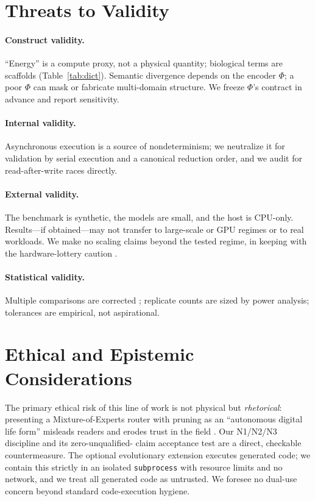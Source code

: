 \documentclass[11pt]{article}
\begin{document}
\section{Threats to Validity}
\paragraph{Construct validity.}
``Energy'' is a compute proxy, not a physical quantity; biological terms are
scaffolds (Table~\ref{tab:dict}). Semantic divergence depends on the encoder
$\Phi$; a poor $\Phi$ can mask or fabricate multi-domain structure. We freeze
$\Phi$'s contract in advance and report sensitivity.

\paragraph{Internal validity.}
Asynchronous execution is a source of nondeterminism; we neutralize it for
validation by serial execution and a canonical reduction order, and we
audit for read-after-write races directly.

\paragraph{External validity.}
The benchmark is synthetic, the models are small, and the host is CPU-only.
Results---if obtained---may not transfer to large-scale or GPU regimes or to
real workloads. We make no scaling claims beyond the tested regime, in keeping
with the hardware-lottery caution \cite{hooker2021hardware}.

\paragraph{Statistical validity.}
Multiple comparisons are corrected \cite{holm1979bonferroni}; replicate counts
are sized by power analysis; tolerances are empirical, not aspirational.

\section{Ethical and Epistemic Considerations}
The primary ethical risk of this line of work is not physical but
\emph{rhetorical}: presenting a Mixture-of-Experts router with pruning as an
``autonomous digital life form'' misleads readers and erodes trust in the field
\cite{lipton2019troubling}. Our N1/N2/N3 discipline and its zero-unqualified-%
claim acceptance test are a direct, checkable countermeasure. The optional
evolutionary extension executes generated code; we contain this strictly in an
isolated \texttt{subprocess} with resource limits and no network, and we treat
all generated code as untrusted. We foresee no dual-use concern beyond standard
code-execution hygiene.
\end{document}
